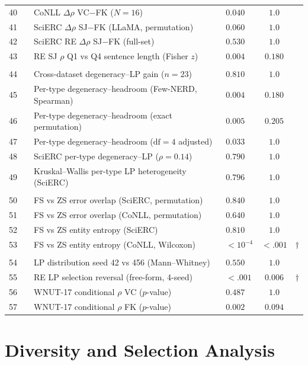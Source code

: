 \begin{table}[t]
\begin{tabular}{clllcc}
40 & & CoNLL $\Delta\rho$ VC$-$FK ($N{=}16$) & $0.040$ & $1.0$ &  \\
41 & & SciERC $\Delta\rho$ SJ$-$FK (LLaMA, permutation) & $0.060$ & $1.0$ &  \\
42 & & SciERC RE $\Delta\rho$ SJ$-$FK (full-set) & $0.530$ & $1.0$ &  \\
43 & & RE SJ $\rho$ Q1 vs Q4 sentence length (Fisher $z$) & $0.004$ & $0.180$ &  \\
\addlinespace
\multicolumn{6}{l}{\textit{Correlation}} \\
44 & & Cross-dataset degeneracy--LP gain ($n{=}23$) & $0.810$ & $1.0$ &  \\
45 & & Per-type degeneracy--headroom (Few-NERD, Spearman) & $0.004$ & $0.180$ &  \\
46 & & Per-type degeneracy--headroom (exact permutation) & $0.005$ & $0.205$ &  \\
47 & & Per-type degeneracy--headroom ($\text{df}{=}4$ adjusted) & $0.033$ & $1.0$ &  \\
48 & & SciERC per-type degeneracy--LP ($\rho{=}0.14$) & $0.790$ & $1.0$ &  \\
49 & & Kruskal--Wallis per-type LP heterogeneity (SciERC) & $0.796$ & $1.0$ &  \\
\addlinespace
\multicolumn{6}{l}{\textit{FS error}} \\
50 & & FS vs ZS error overlap (SciERC, permutation) & $0.840$ & $1.0$ &  \\
51 & & FS vs ZS error overlap (CoNLL, permutation) & $0.640$ & $1.0$ &  \\
52 & & FS vs ZS entity entropy (SciERC) & $0.810$ & $1.0$ &  \\
53 & & FS vs ZS entity entropy (CoNLL, Wilcoxon) & ${<}10^{-4}$ & ${<}.001$ & $\dagger$ \\
\addlinespace
\multicolumn{6}{l}{\textit{Other}} \\
54 & & LP distribution seed 42 vs 456 (Mann--Whitney) & $0.550$ & $1.0$ &  \\
55 & & RE LP selection reversal (free-form, 4-seed) & ${<}.001$ & $0.006$ & $\dagger$ \\
56 & & WNUT-17 conditional $\rho$ VC ($p$-value) & $0.487$ & $1.0$ &  \\
57 & & WNUT-17 conditional $\rho$ FK ($p$-value) & $0.002$ & $0.094$ &  \\
\bottomrule
\end{tabular}
\end{table}

\section{Diversity and Selection Analysis}\label{app:diversity}

